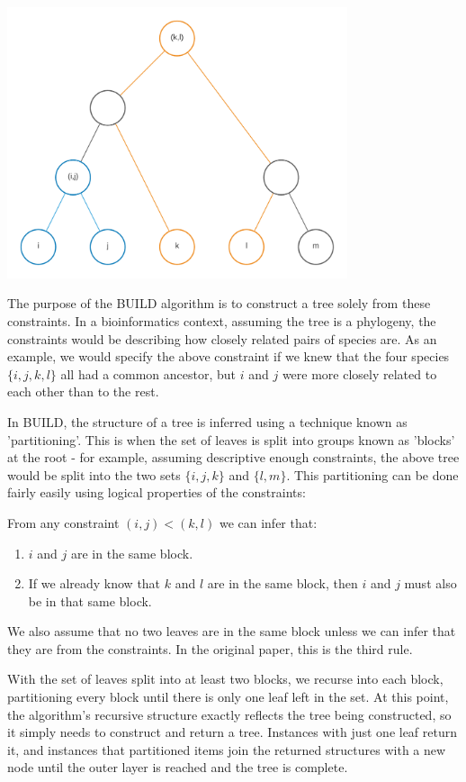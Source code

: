 \documentclass[11pt]{article} %
\begin{document}
\begin{center}
	\includegraphics[width=10cm]{buildexample}
\end{center}

The purpose of the BUILD algorithm is to construct a tree solely from these constraints. In a bioinformatics context, assuming the tree is a phylogeny, the constraints would be describing how closely related pairs of species are. As an example, we would specify the above constraint if we knew that the four species $\{i,j,k,l\}$ all had a common ancestor, but $i$ and $j$ were more closely related to each other than to the rest.

In BUILD, the structure of a tree is inferred using a technique known as 'partitioning'. This is when the set of leaves is split into groups known as 'blocks' at the root - for example, assuming descriptive enough constraints, the above tree would be split into the two sets $\{i,j,k\}$ and $\{l,m\}$. This partitioning can be done fairly easily using logical properties of the constraints:

From any constraint $(i,j)<(k,l)$ we can infer that:
\begin{enumerate}
	\item $i$ and $j$ are in the same block.
	\item If we already know that $k$ and $l$ are in the same block, then $i$ and $j$ must also be in that same block.
\end{enumerate}

We also assume that no two leaves are in the same block unless we can infer that they are from the constraints. In the original paper, this is the third rule.

With the set of leaves split into at least two blocks, we recurse into each block, partitioning every block until there is only one leaf left in the set. At this point, the algorithm's recursive structure exactly reflects the tree being constructed, so it simply needs to construct and return a tree. Instances with just one leaf return it, and instances that partitioned items join the returned structures with a new node until the outer layer is reached and the tree is complete.
\end{document}
